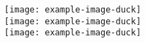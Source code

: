 \documentclass{article}
\begin{document}
\begin{figure}
    \center
    \texttt{[image: example-image-duck]}\\ %
    \texttt{[image: example-image-duck]}\\ %
    \texttt{[image: example-image-duck]}\\ %
\end{figure}
\end{document}
